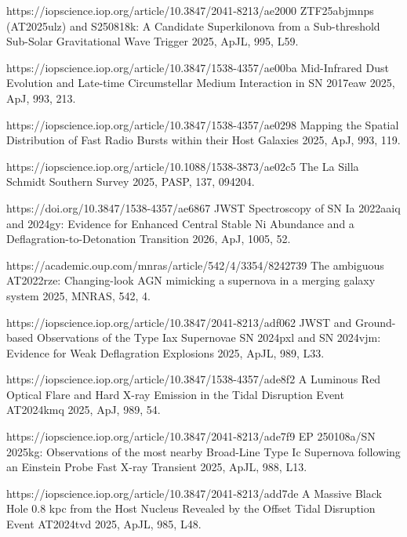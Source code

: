 \begin{cvpubs}
\begin{cvpubitems}
{}
{https://iopscience.iop.org/article/10.3847/2041-8213/ae2000}
{ZTF25abjmnps (AT2025ulz) and S250818k: A Candidate Superkilonova from a Sub-threshold Sub-Solar Gravitational Wave Trigger}
{2025, ApJL, 995, L59.}

{}
{https://iopscience.iop.org/article/10.3847/1538-4357/ae00ba}
{Mid-Infrared Dust Evolution and Late-time Circumstellar Medium Interaction in SN 2017eaw}
{2025, ApJ, 993, 213.}

{}
{https://iopscience.iop.org/article/10.3847/1538-4357/ae0298}
{Mapping the Spatial Distribution of Fast Radio Bursts within their Host Galaxies}
{2025, ApJ, 993, 119.}

{}
{https://iopscience.iop.org/article/10.1088/1538-3873/ae02c5}
{The La Silla Schmidt Southern Survey}
{2025, PASP, 137, 094204.}

{}
{https://doi.org/10.3847/1538-4357/ae6867}
{JWST Spectroscopy of SN Ia 2022aaiq and 2024gy: Evidence for Enhanced Central Stable Ni Abundance and a Deflagration-to-Detonation Transition}
{2026, ApJ, 1005, 52.}

{}
{https://academic.oup.com/mnras/article/542/4/3354/8242739}
{The ambiguous AT2022rze: Changing-look AGN mimicking a supernova in a merging galaxy system}
{2025, MNRAS, 542, 4.}

{}
{https://iopscience.iop.org/article/10.3847/2041-8213/adf062}
{JWST and Ground-based Observations of the Type Iax Supernovae SN 2024pxl and SN 2024vjm: Evidence for Weak Deflagration Explosions}
{2025, ApJL, 989, L33.}

{}
{https://iopscience.iop.org/article/10.3847/1538-4357/ade8f2}
{A Luminous Red Optical Flare and Hard X-ray Emission in the Tidal Disruption Event AT2024kmq}
{2025, ApJ, 989, 54.}

{}
{https://iopscience.iop.org/article/10.3847/2041-8213/ade7f9}
{EP 250108a/SN 2025kg: Observations of the most nearby Broad-Line Type Ic Supernova following an Einstein Probe Fast X-ray Transient}
{2025, ApJL, 988, L13.}

{}
{https://iopscience.iop.org/article/10.3847/2041-8213/add7de}
{A Massive Black Hole 0.8 kpc from the Host Nucleus Revealed by the Offset Tidal Disruption Event AT2024tvd}
{2025, ApJL, 985, L48.}


\end{cvpubitems}
\end{cvpubs}
